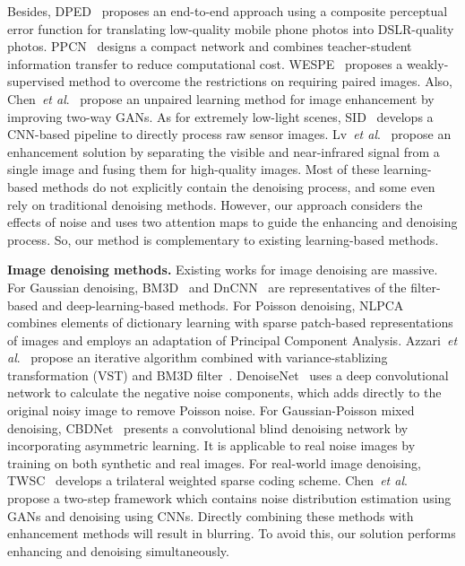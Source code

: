 Besides, DPED~\cite{ignatov2017dslr,de2018fast} proposes an end-to-end approach using a composite perceptual error function for translating low-quality mobile phone photos into DSLR-quality photos. PPCN~\cite{Hui-PPCN-2018} designs a compact network and combines teacher-student information transfer to reduce computational cost. WESPE~\cite{ignatov2018wespe} proposes a weakly-supervised method to overcome the restrictions on requiring paired images. Also, Chen~\textit{et al}.~\cite{chen2018deep} propose an unpaired learning method for
image enhancement by improving two-way GANs.
As for extremely low-light scenes, SID~\cite{seedark2018cvpr} develops a CNN-based pipeline to directly process raw sensor images.
Lv~\textit{et al}.~\cite{lv202024hour} propose an enhancement solution by separating the visible and near-infrared signal from a single image and fusing them for high-quality images.
Most of these learning-based methods do not explicitly contain the denoising process, and some even rely on traditional denoising methods. However, our approach considers the effects of noise and uses two attention maps to guide the enhancing and denoising process. So, our method is complementary to existing learning-based methods.

{\bf Image denoising methods.} Existing works for image denoising are massive. For Gaussian denoising, BM3D~\cite{dabov2006image} and DnCNN~\cite{zhang2017beyond} are representatives of the filter-based and deep-learning-based methods. For Poisson denoising, NLPCA~\cite{salmon2014poisson} combines elements of dictionary learning with sparse patch-based representations of images and employs an adaptation of Principal Component Analysis. Azzari~\textit{et al}.~\cite{azzari2016variance} propose an iterative algorithm combined with variance-stablizing transformation (VST) and BM3D filter~\cite{dabov2006image}. DenoiseNet~\cite{remez2017deep} uses a deep convolutional network to calculate the negative noise components, which adds directly to the original noisy image to remove Poisson noise. For Gaussian-Poisson mixed denoising, CBDNet~\cite{Guo2019Cbdnet} presents a convolutional blind denoising network by incorporating asymmetric learning. It is applicable to real noise images by training on both synthetic and real images. For real-world image denoising, TWSC~\cite{TWSC_ECCV2018} develops a trilateral weighted sparse coding scheme. Chen~\textit{et al}.~\cite{chen2018image} propose a two-step framework which contains noise distribution estimation using GANs and denoising using CNNs. Directly combining these methods with enhancement methods will result in blurring. To avoid this, our solution performs enhancing and denoising simultaneously.

